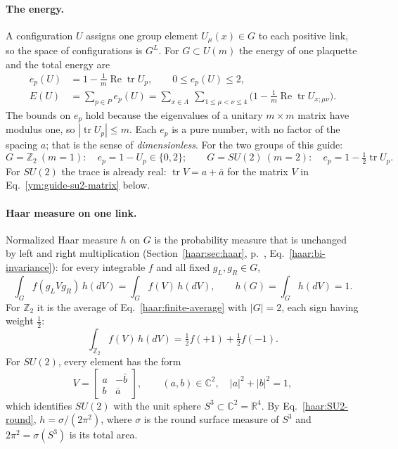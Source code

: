 \paragraph{The energy.}
A configuration $U$ assigns one group element $U_\mu(x)\in G$ to each
positive link, so the space of configurations is $G^L$. For $G\subset U(m)$
the energy of one plaquette and the total energy are
\begin{align}
 e_p(U)&=1-\frac1m\operatorname{Re}\operatorname{tr}U_p,
 \qquad 0\le e_p(U)\le2,\label{ym:guide-plaquette-energy}\\
 E(U)&=\sum_{p\in P}e_p(U)
 =\sum_{x\in\Lambda}\ \sum_{1\le\mu<\nu\le4}
 \Big(1-\frac1m\operatorname{Re}\operatorname{tr}U_{x;\mu\nu}\Big).
 \label{ym:guide-energy}
\end{align}
The bounds on $e_p$ hold because the eigenvalues of a unitary $m\times m$
matrix have modulus one, so $|\operatorname{tr}U_p|\le m$. Each $e_p$ is a
pure number, with no factor of the spacing $a$; that is the sense of
\emph{dimensionless}. For the two groups of this guide:
\begin{equation}\label{ym:guide-energy-examples}
 G=\mathbb Z_2\ (m=1):\quad e_p=1-U_p\in\{0,2\};
 \qquad
 G=SU(2)\ (m=2):\quad e_p=1-\tfrac12\operatorname{tr}U_p .
\end{equation}
For $SU(2)$ the trace is already real: $\operatorname{tr}V=a+\bar a$ for the
matrix $V$ in Eq.~\eqref{ym:guide-su2-matrix} below.

\paragraph{Haar measure on one link.}
Normalized Haar measure $h$ on $G$ is the probability measure that is
unchanged by left and right multiplication (Section~\ref{haar:sec:haar},
p.~\pageref{haar:sec:haar}, Eq.~\eqref{haar:bi-invariance}): for every
integrable $f$ and all fixed $g_L,g_R\in G$,
\begin{equation}\label{ym:guide-haar}
 \int_Gf(g_LVg_R)\,h(dV)=\int_Gf(V)\,h(dV),\qquad h(G)=\int_Gh(dV)=1 .
\end{equation}
For $\mathbb Z_2$ it is the average of Eq.~\eqref{haar:finite-average} with
$|G|=2$, each sign having weight $\frac12$:
\begin{equation}\label{ym:guide-haar-z2}
 \int_{\mathbb Z_2}f(V)\,h(dV)=\tfrac12f(+1)+\tfrac12f(-1).
\end{equation}
For $SU(2)$, every element has the form
\begin{equation}\label{ym:guide-su2-matrix}
 V=\begin{bmatrix}a&-\bar b\\ b&\bar a\end{bmatrix},\qquad
 (a,b)\in\mathbb C^2,\quad|a|^2+|b|^2=1,
\end{equation}
which identifies $SU(2)$ with the unit sphere $S^3\subset\mathbb C^2=\mathbb R^4$.
By Eq.~\eqref{haar:SU2-round}, $h=\sigma/(2\pi^2)$, where $\sigma$ is the
round surface measure of $S^3$ and $2\pi^2=\sigma(S^3)$ is its total area.

